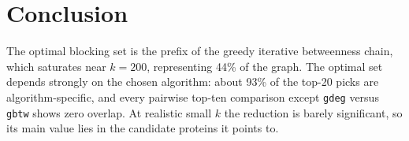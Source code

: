 \documentclass[9pt,a4paper,twocolumn,twoside]{tau-class/tau}
\begin{document}
\section{Conclusion}

The optimal blocking set is the prefix of the greedy iterative betweenness chain, which saturates near $k = 200$, representing 44\% of the graph. The optimal set depends strongly on the chosen algorithm: about 93\% of the top-20 picks are algorithm-specific, and every pairwise top-ten comparison except \texttt{gdeg} versus \texttt{gbtw} shows zero overlap. At realistic small $k$ the reduction is barely significant, so its main value lies in the candidate proteins it points to.


\printbibliography

\end{document}
